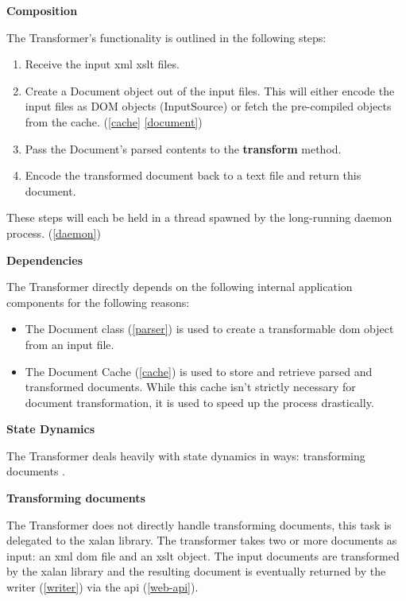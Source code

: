 \textbf{Composition}

The Transformer's functionality is outlined in the following steps:

\begin{enumerate}
  \item Receive the input \gls{xml} \gls{xslt} files.
  \item Create a Document object out of the input files. This will either encode the input files as DOM objects (InputSource) or fetch the pre-compiled objects from the cache. (\ref{cache} \ref{document})
  \item Pass the Document's parsed contents to the \cite{xalan-library} \textbf{transform} method.
  \item Encode the transformed document back to a text file and return this document.
\end{enumerate}

These steps will each be held in a thread spawned by the long-running daemon process. (\ref{daemon})

\textbf{Dependencies}

The Transformer directly depends on the following internal application components for the following reasons:

\begin{itemize}
  \item {
      The Document class (\ref{parser}) is used to create a transformable \gls{dom} object from an input file. \cite{dom-spec}
  }
  \item {
    The Document Cache (\ref{cache}) is used to store and retrieve parsed and transformed documents.
    While this cache isn't strictly necessary for document transformation, it is used to speed up the process drastically.
  }
\end{itemize}

\textbf{State Dynamics}

The Transformer deals heavily with state dynamics in ways: transforming documents .

\textbf{Transforming documents}

The Transformer does not directly handle transforming documents, this task is delegated to the \gls{xalan} library. \cite{xalan-library}
The transformer takes two or more documents as input: an \gls{xml} \gls{dom} file and an \gls{xslt} object.
The input documents are transformed by the \gls{xalan} library and the resulting document is eventually returned by the writer (\ref{writer}) via the \gls{api} (\ref{web-api}).

